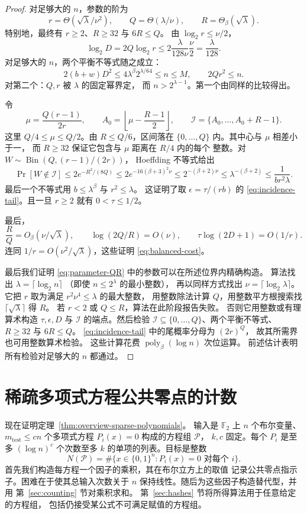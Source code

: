 \documentclass[11pt,reqno]{amsart}
\numberwithin{equation}{section}
\theoremstyle{definition}\newtheorem{definition}[theorem]{定义}
\theoremstyle{remark}\newtheorem{remark}[theorem]{注}
\newcommand{\poly}{\operatorname{poly}}
\renewcommand{\le}{\leqslant}
\renewcommand{\ge}{\geqslant}
\begin{document}
\begin{proof}
对足够大的 $n$，参数的阶为
\[
 r=\Theta(\sqrt\lambda/\nu^2),\qquad
 Q=\Theta(\lambda/\nu),\qquad R=\Theta_\beta(\sqrt\lambda).
\]
特别地，最终有 $r\ge2$、$R\ge32$ 与 $6R\le Q$。
由 $\log_2 r\le\nu/2$，
\[
 \log_2 D=2Q\log_2 r
 \le2\frac{\lambda}{128\nu}\frac\nu2=\frac{\lambda}{128}.
\]
对足够大的 $n$，两个平衡不等式随之成立：
\[
 2(b+w)D^2\le4\lambda^\beta2^{\lambda/64}\le n\le M,
 \qquad 2Qr^2\le n.
\]
对第二个：$Q,r$ 被 $\lambda$ 的固定幂界定，
而 $n>2^{\lambda-1}$。第一个由同样的比较得出。

令
\[
 \mu=\frac{Q(r-1)}{2r},\qquad
 A_0=\left\lfloor\mu-\frac{R-1}{2}\right\rfloor,
 \qquad \mathcal I=\{A_0,\ldots,A_0+R-1\}.
\]
这里 $Q/4\le\mu\le Q/2$。由 $R\le Q/6$，区间落在
$\{0,\ldots,Q\}$ 内。其中心与 $\mu$ 相差小于一，
而 $R\ge32$ 保证它包含与 $\mu$ 距离在 $R/4$ 内的每个
整数。对 $W\sim\operatorname{Bin}(Q,(r-1)/(2r))$，
Hoeffding 不等式给出
\[
 \Pr[W\notin\mathcal I]
 \le2e^{-R^2/(8Q)}
 \le2e^{-16(\beta+3)^2\nu}
 \le2^{-(\beta+2)\nu}
 \le\lambda^{-(\beta+2)}
 \le\frac1{br^2\lambda}.
\]
最后一个不等式用 $b\le\lambda^\beta$ 与 $r^2\le\lambda$。
这证明了取 $\epsilon=\tau/(rb)$ 的
\eqref{eq:incidence-tail}。且一旦 $r\ge2$ 就有
$0<\tau\le1/2$。

最后，
\[
 \frac RQ=O_\beta(\nu/\sqrt\lambda),\qquad
 \log(2Q/R)=O(\nu),\qquad
 \tau\log(2D+1)=O(1/r).
\]
连同 $1/r=O(\nu^2/\sqrt\lambda)$，这些证明
\eqref{eq:balanced-cost}。

最后我们证明 \eqref{eq:parameter-QR}
中的参数可以在所述位界内精确构造。
算法找出 $\lambda=\lceil\log_2 n\rceil$
（即使 $n\le2^\lambda$ 的最小整数），
再以同样方式找出 $\nu=\lceil\log_2\lambda\rceil$。
它把 $r$ 取为满足 $r^2\nu^4\le\lambda$ 的最大整数，
用整数除法计算 $Q$，用整数平方根搜索找
$\lceil\sqrt\lambda\rceil$ 得 $R$。
若 $r<2$ 或 $Q\le R$，算法在此阶段报告失败。
否则它用整数或有理算术构造 $\tau,\epsilon,D$
与 $\mathcal I$ 的端点。然后检验
$\mathcal I\subseteq\{0,\ldots,Q\}$、两个平衡不等式、
$R\ge32$ 与 $6R\le Q$。
\eqref{eq:incidence-tail} 中的尾概率分母为 $(2r)^Q$，
故其所需界也可用整数算术检验。
这些计算花费 $\poly_\beta(\log n)$ 次位运算。
前述估计表明所有检验对足够大的 $n$ 都通过。
\end{proof}
\section{稀疏多项式方程公共零点的计数}\label{sec:setup}
现在证明定理~\ref{thm:overview-sparse-polynomials}。
输入是 $\mathbb F_2$ 上 $n$ 个布尔变量、$m_{\mathrm{test}}\le cn$
个多项式方程 $P_i(x)=0$ 构成的方程组 $\mathcal P$，
$k,c$ 固定。每个 $P_i$ 是至多 $(\log n)^c$ 个次数至多 $k$
的单项的列表。目标是整数
\begin{equation}\label{eq:common-zero-count}
 N(\mathcal P)=\#\{x\in\{0,1\}^n:P_i(x)=0\text{ 对每个 }i\}.
\end{equation}
首先我们构造每方程一个因子的乘积，其在布尔立方上的取值
记录公共零点指示子。困难在于使其总输入次数关于 $n$
保持线性。随后为这些因子构造替代型，并用
第~\ref{sec:counting} 节对乘积求和。
第~\ref{sec:hashes} 节将所得算法用于任意给定的方程组，
包括仍接受某公式不可满足赋值的方程组。
\end{document}
